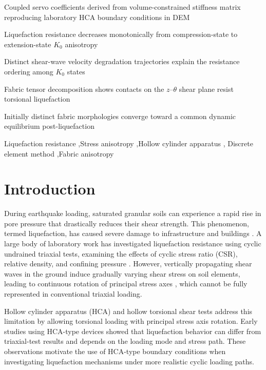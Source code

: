 \documentclass[a4paper,fleqn]{cas-sc}
\newcommand{\Kzero}{\ensuremath{K_0}}
\begin{document}
\begin{highlights}
\item Coupled servo coefficients derived from volume-constrained stiffness matrix reproducing laboratory HCA boundary conditions in DEM
\item Liquefaction resistance decreases monotonically from compression-state to extension-state \Kzero{} anisotropy
\item Distinct shear-wave velocity degradation trajectories explain the resistance ordering among \Kzero{} states
\item Fabric tensor decomposition shows contacts on the $z$--$\theta$ shear plane resist torsional liquefaction
\item Initially distinct fabric morphologies converge toward a common dynamic equilibrium post-liquefaction
\end{highlights}

\begin{keywords}
Liquefaction resistance \sep Stress anisotropy \sep Hollow cylinder apparatus \sep
Discrete element method \sep Fabric anisotropy
\end{keywords}

\maketitle

\section{Introduction}
\label{sec:introduction}

During earthquake loading, saturated granular soils can experience a rapid rise in pore pressure that drastically reduces their shear strength. This phenomenon, termed liquefaction, has caused severe damage to infrastructure and buildings \citep{IshiharaKoga1981,SeedIdriss1967}. A large body of laboratory work has investigated liquefaction resistance using cyclic undrained triaxial tests, examining the effects of cyclic stress ratio (CSR), relative density, and confining pressure \citep{Hyodo1991,SeedLee1966,Silver1976,Toki1986}. However, vertically propagating shear waves in the ground induce gradually varying shear stress on soil elements, leading to continuous rotation of principal stress axes \citep{Arthur1980,IshiharaTowhata1983}, which cannot be fully represented in conventional triaxial loading.

Hollow cylinder apparatus (HCA) and hollow torsional shear tests address this limitation by allowing torsional loading with principal stress axis rotation. Early studies using HCA-type devices \citep[e.g.,][]{IshiharaYasuda1975,Tatsuoka1986,YamashitaToki1993} showed that liquefaction behavior can differ from triaxial-test results and depends on the loading mode and stress path. These observations motivate the use of HCA-type boundary conditions when investigating liquefaction mechanisms under more realistic cyclic loading paths.
\end{document}
